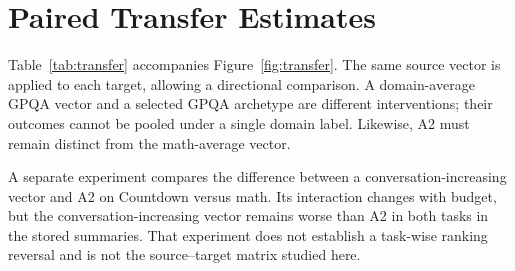 \section{Paired Transfer Estimates}
\label{app:transfer}
\begin{table}[t]
\centering\small

\caption{Selected Qwen3.5-9B domain-profile transfers. Accuracy and answer changes are percentage points; token changes are generated tokens. Estimates use the paired unsteered target baseline. Intervals resample tasks after averaging two decoding seeds. Comparisons share baselines and are not a newly multiplicity-adjusted family.}
\label{tab:transfer}
\end{table}
Table~\ref{tab:transfer} accompanies Figure~\ref{fig:transfer}. The same source vector is applied to each target, allowing a directional comparison. A domain-average GPQA vector and a selected GPQA archetype are different interventions; their outcomes cannot be pooled under a single domain label. Likewise, A2 must remain distinct from the math-average vector.

A separate experiment compares the difference between a conversation-increasing vector and A2 on Countdown versus math. Its interaction changes with budget, but the conversation-increasing vector remains worse than A2 in both tasks in the stored summaries. That experiment does not establish a task-wise ranking reversal and is not the source--target matrix studied here.

